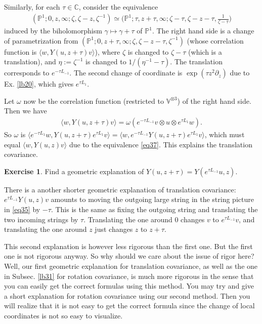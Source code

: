 \documentclass[11pt,b5paper,notitlepage]{article}
\theoremstyle{definition}
\newtheorem{exe}[df]{Exercise}
\theoremstyle{plain}
\newcommand{\bk}[1]{\langle {#1}\rangle}
\newcommand{\Vbb}{\mathbb V}
\newcommand{\Cbb}{\mathbb C}
\newcommand{\Pbb}{\mathbb P}
\numberwithin{equation}{section}
\begin{document}
\subsection{}\label{lb40}

Similarly, for each $\tau\in\Cbb$, consider the equivalence
\begin{align}
	(\Pbb^1;0,z,\infty;\zeta,\zeta-z,\zeta^{-1})\simeq \big(\Pbb^1;\tau,z+\tau,\infty;\zeta-\tau,\zeta-z-\tau,\frac 1{\zeta-\tau}\big)\label{eq37}
\end{align}
induced by the biholomorphism $\gamma\mapsto\gamma+\tau$ of $\Pbb^1$. The right hand side is a change of parametrization from $(\Pbb^1;0,z+\tau,\infty;\zeta,\zeta-z-\tau,\zeta^{-1})$ (whose correlation function is $\bk{w,Y(u,z+\tau)v}$), where $\zeta$ is changed to $\zeta-\tau$ (which is a translation), and $\eta:=\zeta^{-1}$ is changed to $1/(\eta^{-1}-\tau)$. The translation corresponds to $e^{-\tau L_{-1}}$. The second change of coordinate is $\exp(\tau z^{2}\partial_z)$ due to Ex. \ref{lb20}, which gives $e^{\tau L_1}$.

Let $\omega$ now be the correlation function (restricted to $\Vbb^{\otimes 3}$) of the right hand side. Then we have
\begin{align*}
\bk{w,Y(u,z+\tau)v}=\omega(e^{-\tau L_{-1}}v\otimes u\otimes e^{\tau L_1}w).
\end{align*} 
So $\omega$ is $\bk{e^{-\tau L_1}w,Y(u,z+\tau)e^{\tau L_1}v}=\bk{w,e^{-\tau L_{-1}}Y(u,z+\tau)e^{\tau L_1}v}$, which must equal $\bk{w,Y(u,z)v}$ due to the equivalence \eqref{eq37}. This explains the translation covariance.

\begin{exe}
Find a geometric explanation of $Y(u,z+\tau)=Y(e^{\tau L_{-1}}u,z)$.
\end{exe}

There is a another shorter geometric explanation of translation covariance: $e^{\tau L_{-1}}Y(u,z)v$ amounts to moving the outgoing large string in the string picture in \eqref{eq35} by $-\tau$. This is the same as fixing the outgoing string and translating the two incoming strings by $\tau$. Translating the one around $0$ changes $v$ to $e^{\tau L_{-1}}v$, and translating the one around $z$ just changes $z$ to $z+\tau$.

This second explanation is however less rigorous than the first one. But the first one is not  rigorous anyway. So why should we care about the issue of rigor here? Well, our first geometric explanation for translation covariance, as well as the one in Subsec. \ref{lb31} for rotation covariance, is much more rigorous in the sense that you can easily get the correct formulas using this method. You may try and give a short explanation for rotation covariance using our second method. Then you will realize that it is not easy to get the correct formula since the change of local coordinates is not so easy to visualize.
\end{document}
